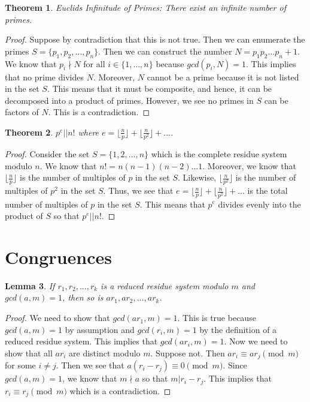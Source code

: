 \documentclass[psamsfonts]{amsart}
\newtheorem{thm}{Theorem}[section]
\newtheorem{lem}[thm]{Lemma}
\theoremstyle{definition}
\theoremstyle{remark}
\numberwithin{equation}{section}
\begin{document}
\begin{thm}
Euclids Infinitude of Primes: There exist an infinite number of primes.
\end{thm}

\begin{proof}
Suppose by contradiction that this is not true. Then we can enumerate the primes $S = \{p_1, p_2, \ldots, p_n\}$. Then we can construct the number $N = p_1 p_2 \ldots p_n + 1$. We know that $p_i \nmid N$ for all $i \in \{1, \ldots, n\}$ because $gcd(p_i, N) = 1$. This implies that no prime divides $N$. Moreover, $N$ cannot be a prime because it is not listed in the set $S$. This means that it must be composite, and hence, it can be decomposed into a product of primes. However, we see no primes in $S$ can be factors of $N$. This is a contradiction.
\end{proof}

\begin{thm}
$p^e || n!$ where $e = \lfloor \frac{n}{p} \rfloor + \lfloor \frac{n}{p^2} \rfloor + \ldots$. 
\end{thm}

\begin{proof}
Consider the set $S = \{1,2, \ldots, n\}$ which is the complete residue system modulo $n$. We know that $n! = n (n-1) (n-2) \ldots 1$. Moreover, we know that $\lfloor \frac{n}{p} \rfloor$ is the number of multiples of $p$ in the set $S$. Likewise, $\lfloor \frac{n}{p^2} \rfloor$ is the number of multiples of $p^2$ in the set $S$. Thus, we see that $e = \lfloor \frac{n}{p} \rfloor + \lfloor \frac{n}{p^2} \rfloor + \ldots$ is the total number of multiples of $p$ in the set $S$. This means that $p^e$ divides evenly into the product of $S$ so that $p^e || n!$. 
\end{proof}

\section{Congruences}

\begin{lem}
If $r_1, r_2, \ldots, r_k$ is a reduced residue system modulo $m$ and $gcd(a,m) = 1$, then so is $a r_1, a r_2, \ldots, a r_k$. 
\end{lem}

\begin{proof}
We need to show that $gcd(a r_1, m) = 1$. This is true because $gcd(a,m) =1$ by assumption and $gcd(r_i, m) = 1$ by the definition of a reduced residue system. This implies that $gcd(a r_i, m) = 1$. Now we need to show that all $a r_i$ are distinct modulo $m$. Suppose not. Then $a r_i \equiv a r_j \pmod{m}$ for some $i \neq j$. Then we see that $a (r_i - r_j) \equiv 0 \pmod{m}$. Since $gcd(a,m) = 1$, we know that $m \nmid a$ so that $m | r_i - r_j$. This implies that $r_i \equiv r_j \pmod{m}$ which is a contradiction.
\end{proof}
\end{document}
